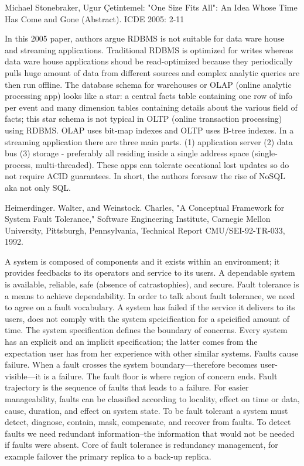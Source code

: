 \documentclass[10pt]{scrbook}
\begin{document}
\begin{thebibliography}{9}

\bibitem{}
{\selectfont
Michael Stonebraker, Ugur Çetintemel:
"One Size Fits All": An Idea Whose Time Has Come and Gone (Abstract). ICDE 2005: 2-11
}

In this 2005 paper, authors argue RDBMS is not suitable for data ware house and streaming applications.
Traditional RDBMS is optimized for writes whereas data ware house applications shoud be read-optimized because
they periodically pulls huge amount of data from different sources and complex analytic queries are then run offline.
The database schema for warehouses or OLAP (online analytic processing app) looks like a star: a central facts table containing
one row of info per event and many dimension tables containing details about the various field of facts;
this star schema is not typical in OLTP (online transaction processing) using RDBMS. OLAP uses bit-map indexes and OLTP uses B-tree indexes.
In a streaming application there are three main parts. 
(1) application server (2) data bus (3) storage - preferably all residing inside a single address space (single-process, multi-threaded).
These apps can tolerate occational lost updates so do not require ACID guarantees. In short, the authors foresaw the rise of NoSQL aka not only SQL.

\bibitem{}
{\selectfont
Heimerdinger. Walter, and Weinstock. Charles, "A Conceptual Framework for System Fault Tolerance," Software Engineering Institute, Carnegie Mellon University, Pittsburgh, Pennsylvania, Technical Report CMU/SEI-92-TR-033, 1992.
}

A system is composed of components and it exists within an environment; it provides feedbacks to its operators and service to its users. A dependable system is available, reliable, safe (absence of catrastophies), and secure. Fault tolerance is a means to achieve dependability. In order to talk about fault tolerance, we need to agree on a fault vocabulary. A system has failed if the service it delivers to its users, does not comply with the system speicification for a speicified amount of time. The system specification defines the boundary of concerns. Every system has an explicit and an implicit specification; the latter comes from the expectation user has from her experience with other similar systems. Faults cause failure. When a fault crosses the system boundary---therefore becomes user-visible---it is a failure. The fault floor is where region of concern ends. Fault trajectory is the sequence of faults that leads to a failure. For easier manageability, faults can be classified according to locality, effect on time or data, cause, duration, and effect on system state. To be fault tolerant a system must detect, diagnose, contain, mask, compensate, and recover from faults. To detect faults we need redundant information--the information that would not be needed if faults were absent. Core of fault tolerance is redundancy management, for example failover the primary replica to a back-up replica.


\end{thebibliography}
\end{document}
